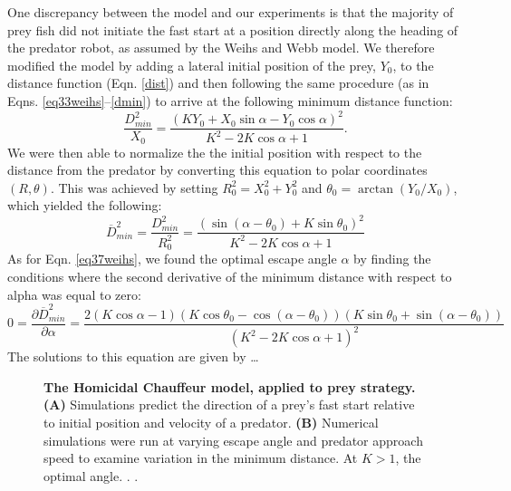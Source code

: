 \documentclass[12pt]{article}
\def\ds{\displaystyle}
\def\d{\partial}
\newcommand{\ol}{\overline}
\begin{document}
One discrepancy between the model and our experiments is that the majority of prey fish did not initiate the fast start at a position directly along the heading of the predator robot, as assumed by the Weihs and Webb model. We therefore modified the model by adding a lateral initial position of the prey, $Y_0$, to the distance function (Eqn. \ref{dist}) and then following the same procedure (as in Eqns. \ref{eq33weihs}--\ref{dmin}) to arrive at the following minimum distance function:
% 
\begin{equation}
\frac{D^2_{min}}{X_0}=\frac{(K Y_0+X_0 \sin \alpha -Y_0\cos \alpha)^2}{K^2-2 K \cos \alpha +1}. 
\label{new_Dmin}
\end{equation}
%
We were then able to normalize the the initial position with respect to the distance from the predator by converting this equation to polar coordinates $(R, \theta)$. This was achieved by setting $R_0^2 = X_0^2 + Y_0^2$ and $\theta_0 = \arctan(Y_0/X_0)$, which yielded the following:
%
\begin{equation}
\ol{D}^2_{min}= \ds\frac{{D}^2_{min}}{R_0^2 }=
\ds\frac{\left ( \sin(\alpha - \theta_0) + K \sin \theta_0 \right )^2}{K^2-2 K \cos \alpha +1} 
\label{Dmin_polar}
\end{equation}
%
As for Eqn. \ref{eq37weihs}, we found the optimal escape angle $\alpha$ by finding the conditions where the second derivative of the minimum distance with respect to alpha was equal to zero:
%
\begin{equation}
0 = \frac{\d \ol{D}^2_{min}}{\d \alpha} = 
\frac{2(K \cos \alpha - 1)(K\cos \theta_0 - \cos(\alpha - \theta_0))(K\sin \theta_0 + \sin(\alpha -\theta_0))}
{(K^2 - 2K \cos \alpha + 1)^2}
\end{equation} 
%
The solutions to this equation are given by \dots


\pagebreak




\pagebreak
\begin{figure}[t]
\begin{centering}
\centering	
\caption{\textbf{The Homicidal Chauffeur model, applied to prey strategy.} \textbf{(A)} Simulations predict the direction of a prey's fast start relative to initial position and velocity of a predator. \textbf{(B)} Numerical simulations were run at varying escape angle and predator approach speed to examine variation in the minimum distance. At $K>1$, the optimal angle. . .  }
\label{weihs_topo}
\end{centering}
\end{figure}

\pagebreak









\end{document}
